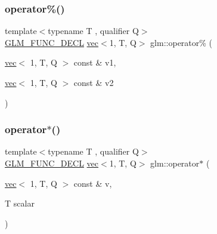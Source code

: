 \subsubsection{\texorpdfstring{operator\%()}{operator\%()}\hspace{0.1cm}{\footnotesize\ttfamily [3/3]}}
{\footnotesize\ttfamily template$<$typename T , qualifier Q$>$ \\
\hyperlink{setup_8hpp_ab2d052de21a70539923e9bcbf6e83a51}{G\+L\+M\+\_\+\+F\+U\+N\+C\+\_\+\+D\+E\+CL} \hyperlink{structglm_1_1vec}{vec}$<$1, T, Q$>$ glm\+::operator\% (\begin{DoxyParamCaption}\item[{\hyperlink{structglm_1_1vec}{vec}$<$ 1, T, Q $>$ const \&}]{v1,  }\item[{\hyperlink{structglm_1_1vec}{vec}$<$ 1, T, Q $>$ const \&}]{v2 }\end{DoxyParamCaption})}

\mbox{\label{group__ext__vec1_ga3831734bcbc3a7d64ddce316291d7a31}} 
\subsubsection{\texorpdfstring{operator$\ast$()}{operator*()}\hspace{0.1cm}{\footnotesize\ttfamily [1/3]}}
{\footnotesize\ttfamily template$<$typename T , qualifier Q$>$ \\
\hyperlink{setup_8hpp_ab2d052de21a70539923e9bcbf6e83a51}{G\+L\+M\+\_\+\+F\+U\+N\+C\+\_\+\+D\+E\+CL} \hyperlink{structglm_1_1vec}{vec}$<$1, T, Q$>$ glm\+::operator$\ast$ (\begin{DoxyParamCaption}\item[{\hyperlink{structglm_1_1vec}{vec}$<$ 1, T, Q $>$ const \&}]{v,  }\item[{T}]{scalar }\end{DoxyParamCaption})}

\mbox{\label{group__ext__vec1_ga83636331813fdbfe423afc01de1f38aa}} 

